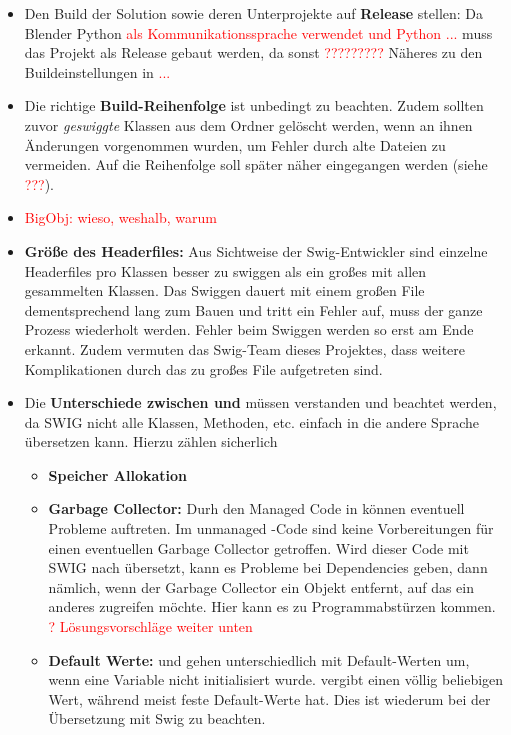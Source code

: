 \begin{itemize}
\item Den Build der Solution sowie deren Unterprojekte auf \textbf{Release} stellen: Da Blender Python \textcolor{red}{als Kommunikationssprache verwendet und Python ...} muss das Projekt als Release gebaut werden, da sonst \textcolor{red}{?????????} Näheres zu den Buildeinstellungen in \textcolor{red}{...}
\item Die richtige \textbf{Build-Reihenfolge} ist unbedingt zu beachten. Zudem sollten zuvor \emph{geswiggte} Klassen aus dem Ordner gelöscht werden, wenn an ihnen Änderungen vorgenommen wurden, um Fehler durch alte Dateien zu vermeiden. Auf die Reihenfolge soll später näher eingegangen werden (siehe \textcolor{red}{???}).
\item \textcolor{red}{BigObj: wieso, weshalb, warum}
\item \textbf{Größe des Headerfiles:} Aus Sichtweise der Swig-Entwickler sind einzelne Headerfiles pro Klassen besser zu swiggen als ein großes mit allen gesammelten Klassen. Das Swiggen dauert mit einem großen File dementsprechend lang zum Bauen und tritt ein Fehler auf, muss der ganze Prozess wiederholt werden. Fehler beim Swiggen werden so erst am Ende erkannt. Zudem vermuten das Swig-Team dieses Projektes, dass weitere Komplikationen durch das zu großes File aufgetreten sind. 
\item Die \textbf{Unterschiede zwischen \CC und \CS} müssen verstanden und beachtet werden, da SWIG nicht alle Klassen, Methoden, etc. einfach in die andere Sprache übersetzen kann. Hierzu zählen sicherlich 
	\begin{itemize}
	\item \textbf{Speicher Allokation}
	\item \textbf{Garbage Collector:} Durh den Managed Code in \CS können eventuell Probleme auftreten. Im unmanaged \CC -Code sind keine Vorbereitungen für einen eventuellen Garbage Collector getroffen. Wird dieser Code mit SWIG nach \CS übersetzt, kann es Probleme bei Dependencies geben, dann nämlich, wenn der Garbage Collector ein Objekt entfernt, auf das ein anderes zugreifen möchte. Hier kann es zu Programmabstürzen kommen. \textcolor{red}{? Lösungsvorschläge weiter unten}
	\item \textbf{Default Werte:} \CC und \CS gehen unterschiedlich mit Default-Werten um, wenn eine Variable nicht initialisiert wurde. \CC vergibt einen völlig beliebigen Wert, während \CS meist feste Default-Werte hat. Dies ist wiederum bei der Übersetzung mit Swig zu beachten. 

\end{itemize}
\end{itemize}
